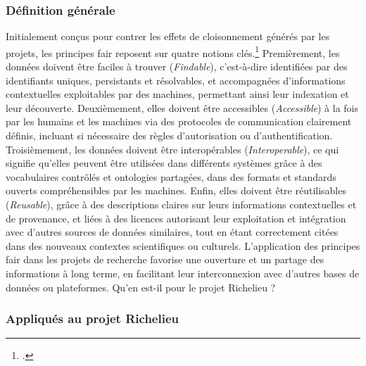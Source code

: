 \subsubsection{Définition générale}
Initialement conçus pour contrer les effets de cloisonnement générés par les projets, les principes  \acrshort{fair} reposent sur quatre notions clés.\footcite{WILKINSONInteroperability2017} Premièrement, les données doivent être faciles à trouver (\textit{Findable}), c'est-à-dire identifiées par des identifiants uniques, persistants et résolvables, et accompagnées d'informations contextuelles exploitables par des machines, permettant ainsi leur indexation et leur découverte. Deuxièmement, elles doivent être accessibles (\textit{Accessible}) à la fois par les humains et les machines via des protocoles de communication clairement définis, incluant si nécessaire des règles d'autorisation ou d'authentification. Troisièmement, les données doivent être interopérables (\textit{Interoperable}), ce qui signifie qu'elles peuvent être utilisées dans différents systèmes grâce à des vocabulaires contrôlés et ontologies partagées, dans des formats et standards ouverts compréhensibles par les machines. Enfin, elles doivent être réutilisables (\textit{Reusable}), grâce à des descriptions claires sur leurs informations contextuelles et de provenance, et liées à des licences autorisant leur exploitation et intégration avec d'autres sources de données similaires, tout en étant correctement citées dans des nouveaux contextes scientifiques ou culturels. L'application des principes  \acrshort{fair} dans les projets de recherche favorise une ouverture et un partage des informations à long terme, en facilitant leur interconnexion avec d'autres bases de données ou plateformes. Qu'en est-il pour le projet Richelieu ? 

\subsubsection{Appliqués au projet Richelieu}

